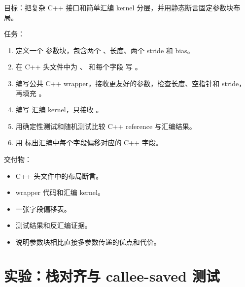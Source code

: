 \begin{labbox}
目标：把复杂 C++ 接口和简单汇编 kernel 分层，并用静态断言固定参数块布局。

任务：

\begin{enumerate}
  \item 定义一个  参数块，包含两个 、长度、两个 stride 和 bias。
  \item 在 C++ 头文件中为 、 和每个字段  写 。
  \item 编写公共 C++ wrapper，接收更友好的参数，检查长度、空指针和 stride，再填充 。
  \item 编写  汇编 kernel，只接收 。
  \item 用确定性测试和随机测试比较 C++ reference 与汇编结果。
  \item 用  标出汇编中每个字段偏移对应的 C++ 字段。
\end{enumerate}

交付物：

\begin{itemize}
  \item C++ 头文件中的布局断言。
  \item wrapper 代码和汇编 kernel。
  \item 一张字段偏移表。
  \item 测试结果和反汇编证据。
  \item 说明参数块相比直接多参数传递的优点和代价。
\end{itemize}
\end{labbox}

\section{实验：栈对齐与 callee-saved 测试}

